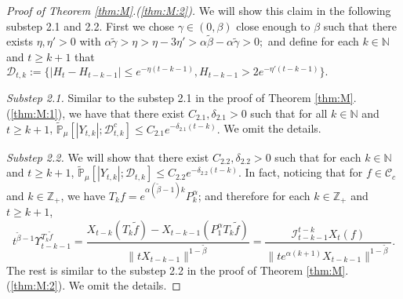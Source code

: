 \documentclass[12pt,a4paper]{amsart}
\theoremstyle{plain}
\theoremstyle{definition}
\numberwithin{equation}{section}
\begin{document}
\begin{proof}[Proof of Theorem \ref{thm:M}.(\ref{thm:M:2})]
  We will show this claim in the following substep 2.1 and 2.2. 
  First we chose $\gamma \in (0,\beta)$ close enough to $\beta$ such that there exists $\eta,\eta'>0$ with
  \(
    \alpha \tilde \gamma
    >\eta
    > \eta - 3\eta' 
    > \alpha \tilde \beta - \alpha \tilde \gamma 
    > 0;
  \)
  and define for each $k \in \mathbb N$ and $t\geq k+1$ that
\(    
\mathcal{D}_{t,k}
    :=\{|H_t-H_{t-k-1}|\leq  e^{-\eta (t-k-1)}, H_{t-k-1}> 2e^{-\eta' (t-k-1)}\}.
\)  
  
  \emph{Substep 2.1.} Similar to the substep 2.1 in the proof of Theorem \ref{thm:M}.(\ref{thm:M:1}), we have that there exist $C_{2.1},\delta_{2.1} >0$ such that for all $k \in \mathbb N$ and $t\geq k+1$,
  \(
    \mathbb{\widetilde{P}}_{\mu}[|Y_{t,k}|;\mathcal{D}^c_{t,k}]
    \leq C_{2.1} e^{-\delta_{2.1} (t-k)}.
  \)
  We omit the details.
 
  \emph{Substep 2.2.} We will show that there exist $C_{2.2},\delta_{2.2} > 0$ such that for each $k\in \mathbb N$ and $t\geq k+1$,
\(    
\mathbb{\widetilde{P}}_{\mu}[|Y_{t,k}|;\mathcal{D}_{t,k}]
    \leq  C_{2.2} e^{-\delta_{2.2} (t-k)}.
\)  
In fact, noticing that for $f\in \mathcal C_c$ and $k\in \mathbb Z_+$, we have $T_kf = e^{\alpha (\tilde \beta - 1 )k}P_k^\alpha $; and therefore for each $k\in \mathbb Z_+$ and $t \geq k + 1$, 
  \[
    t^{\tilde \beta - 1} \Upsilon_{t-k-1}^{T_{k} \tilde f} 
    = \frac{X_{t-k}(T_{k} \tilde f) - X_{t -k-1}(P_1^\alpha T_{k} \tilde f)}{\|t X_{t-k-1}\|^{1-\tilde \beta}} 
    = \frac{\mathcal I_{t - k - 1}^{t - k} X_t(f)}{\|te^{\alpha (k+1)}X_{t-k-1} \|^{1 -\tilde \beta}}.
  \]
  The rest is similar to the substep 2.2 in the proof of Theorem \ref{thm:M}.(\ref{thm:M:2}).
  We omit the details.


\end{proof}
\end{document}
